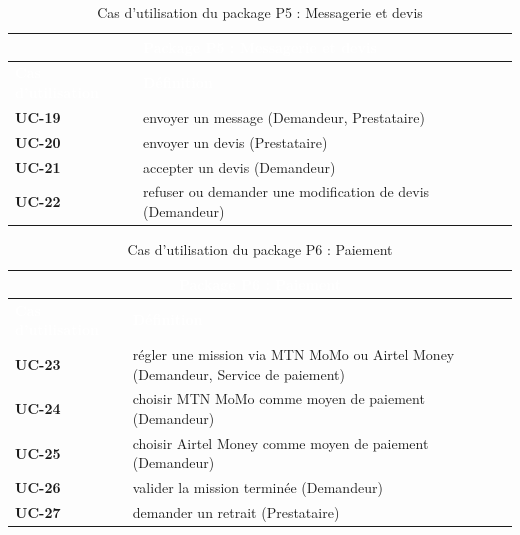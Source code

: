 \begin{table}[H]
	\caption{Cas d'utilisation du package P5 : Messagerie et devis}
	\label{tab:cu_p5}
	\centering
	\begin{tabular}{|p{3cm}|p{10.5cm}|}
		\hline
		\multicolumn{2}{|c|}{\cellcolor{vertCongo}\textcolor{white}{\textbf{Package P5 : Messagerie et devis}}} \\
		\hline
		\rowcolor{vertCongo}
		\textcolor{white}{\textbf{Cas d'utilisation}} & \textcolor{white}{\textbf{Définition}} \\
		\hline
		\textbf{UC-19} & envoyer un message (Demandeur, Prestataire) \\
		\hline
		\textbf{UC-20} & envoyer un devis (Prestataire) \\
		\hline
		\textbf{UC-21} & accepter un devis (Demandeur) \\
		\hline
		\textbf{UC-22} & refuser ou demander une modification de devis (Demandeur) \\
		\hline
	\end{tabular}
\end{table}

\begin{table}[H]
	\caption{Cas d'utilisation du package P6 : Paiement}
	\label{tab:cu_p6}
	\centering
	\begin{tabular}{|p{3cm}|p{10.5cm}|}
		\hline
		\multicolumn{2}{|c|}{\cellcolor{vertCongo}\textcolor{white}{\textbf{Package P6 : Paiement}}} \\
		\hline
		\rowcolor{vertCongo}
		\textcolor{white}{\textbf{Cas d'utilisation}} & \textcolor{white}{\textbf{Définition}} \\
		\hline
		\textbf{UC-23} & régler une mission via MTN MoMo ou Airtel Money (Demandeur, Service de paiement) \\
		\hline
		\textbf{UC-24} & choisir MTN MoMo comme moyen de paiement (Demandeur) \\
		\hline
		\textbf{UC-25} & choisir Airtel Money comme moyen de paiement (Demandeur) \\
		\hline
		\textbf{UC-26} & valider la mission terminée (Demandeur) \\
		\hline
		\textbf{UC-27} & demander un retrait (Prestataire) \\
		\hline
	\end{tabular}
\end{table}

